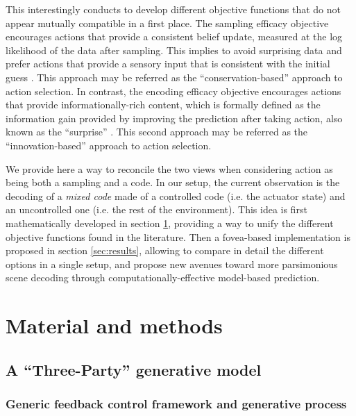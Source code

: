 \documentclass[12pt,twoside,openright]{article}
\begin{document}
This interestingly conducts to develop different objective functions that do not appear mutually compatible in a first place.
The sampling efficacy objective encourages actions that provide a consistent belief update, measured at the log likelihood of the data after sampling. This implies to avoid surprising data and prefer actions that provide a sensory input that is consistent with the initial guess \cite{friston2010free}. This  approach may be referred as the ``conservation-based'' approach to action selection.  
In contrast, the encoding efficacy objective encourages actions that provide informationally-rich content, which is formally defined as the information gain provided by improving the prediction after taking action, also known as the ``surprise'' \cite{itti2005bayesian}. This second approach may be referred as the ``innovation-based'' approach to action selection. 

We provide here a way to reconcile the two views when considering action as being both a sampling and a code. 
In our setup, the current observation is the decoding of a \emph{mixed code}  
made of a controlled code (i.e. the actuator state) and an uncontrolled one (i.e. the rest of the environment). This idea is first mathematically developed in section \ref{sec:material}, providing a way to unify the different objective functions found in the literature. 
Then a fovea-based implementation is proposed in section \ref{sec:results}, allowing to compare in detail the different options in a single setup, and propose new avenues toward more parsimonious scene decoding through computationally-effective model-based prediction.

\section{Material and methods} \label{sec:material}

\subsection{A ``Three-Party'' generative model}\label{sec:three-party}

\subsubsection{Generic feedback control framework and generative process}
\end{document}

